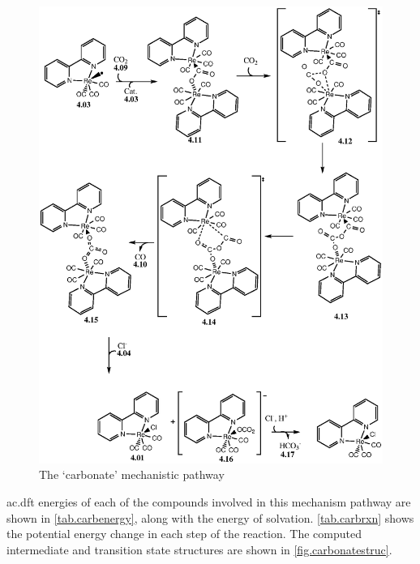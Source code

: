 \begin{figure}[!ht]
 \begin{center}
  \includegraphics[clip=true, width=140mm, keepaspectratio]{images/carbonate.eps}
 \end{center}
\caption{The `carbonate' mechanistic pathway}
\label{fig.carbonate}
\end{figure} 

\Gls{ac.dft} energies of each of the compounds involved in this mechanism pathway are shown in \autoref{tab.carbenergy}, along with the energy of solvation. \autoref{tab.carbrxn} shows the potential energy change in each step of the reaction. The computed intermediate and transition state structures are shown in \autoref{fig.carbonatestruc}.




